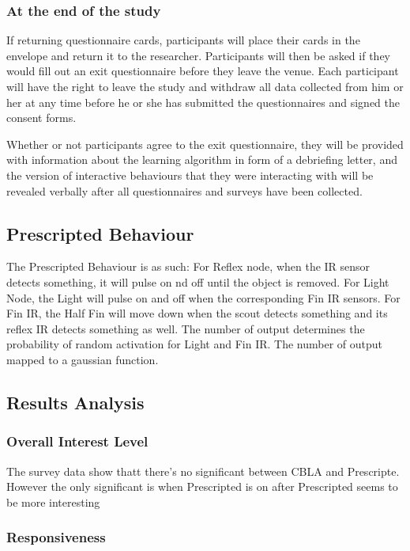 \subsubsection{At the end of the study}

If returning questionnaire cards, participants will place their cards in the envelope and return it to the researcher. Participants will then be asked if they would fill out an exit questionnaire before they leave the venue. Each participant will have the right to leave the study and withdraw all data collected from him or her at any time before he or she has submitted the questionnaires and signed the consent forms. 

Whether or not participants agree to the exit questionnaire, they will be provided with
information about the learning algorithm in form of a debriefing letter, and the version of
interactive behaviours that they were interacting with will be revealed verbally after all
questionnaires and surveys have been collected.

\subsection{Prescripted Behaviour}

The Prescripted Behaviour is as such:
For Reflex node, when the IR sensor detects something, it will pulse on nd off until the object is removed.
For Light Node, the Light will pulse on and off when the corresponding Fin IR sensors.
For Fin IR, the Half Fin will move down when the scout detects something and its reflex IR detects something as well.  
The number of output determines the probability of random activation for Light and Fin IR. The number of output mapped to a gaussian function. 


\subsection{Results Analysis}

\subsubsection{Overall Interest Level}
The survey data show thatt there's no significant between CBLA and Prescripte.
However the only significant is when Prescripted is on after Prescripted seems to be more interesting
 
\subsubsection{Responsiveness}


